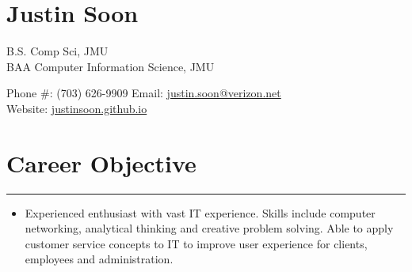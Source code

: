 \documentclass[a4paper]{article}
\author{Justin Soon}
\begin{document}
\section*{\huge\textbf Justin Soon}
\begin{minipage}{.45\linewidth}
	\begin{flushleft}
		B.S. Comp Sci, JMU\\
		BAA Computer Information Science, JMU\\
	\end{flushleft}
\end{minipage}
\hfill
\begin{minipage}{.45\linewidth}
	\begin{flushright}
		Phone #: (703) 626-9909
		Email: \href{mailto:justin.soon@verizon.net}{justin.soon@verizon.net}\\
		Website: \href{http://justinsoon.github.io/}{justinsoon.github.io}\\
	\end{flushright}
\end{minipage}

\section*{Career Objective}
\hrule
\vspace{3mm}
\begin{itemize}
	\item Experienced enthusiast with vast IT experience. Skills include computer networking, analytical thinking and creative problem solving. Able to apply customer service concepts to IT to improve user experience for clients, employees and administration.\\
\end{itemize}

\end{document}
